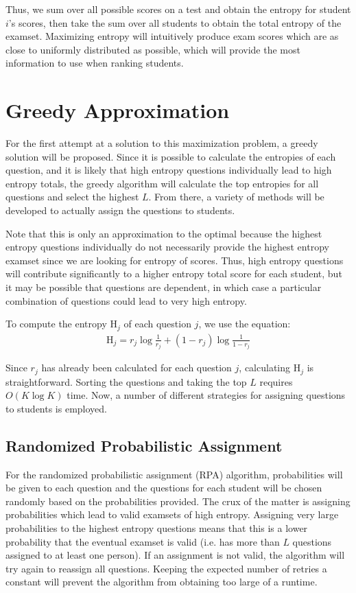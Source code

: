 \documentclass[psamsfonts]{amsart}
\begin{document}
Thus, we sum over all possible scores on a test and obtain the entropy for student $i$'s scores, then take the sum over all students to obtain the total entropy of the examset. Maximizing entropy will intuitively produce exam scores which are as close to uniformly distributed as possible, which will provide the most information to use when ranking students.

\section{Greedy Approximation}

For the first attempt at a solution to this maximization problem, a greedy solution will be proposed. Since it is possible to calculate the entropies of each question, and it is likely that high entropy questions individually lead to high entropy totals, the greedy algorithm will calculate the top entropies for all questions and select the highest $L$. From there, a variety of methods will be developed to actually assign the questions to students. 

Note that this is only an approximation to the optimal because the highest entropy questions individually do not necessarily provide the highest entropy examset since we are looking for entropy of scores. Thus, high entropy questions will contribute significantly to a higher entropy total score for each student, but it may be possible that questions are dependent, in which case a particular combination of questions could lead to very high entropy. 

To compute the entropy $\mathrm{H}_j$ of each question $j$, we use the equation:
\begin{eqnarray}
\mathrm{H}_j = r_j \log \frac{1}{r_j} + (1 - r_j) \log \frac{1}{1 - r_j}
\end{eqnarray}

Since $r_j$ has already been calculated for each question $j$, calculating $\mathrm{H}_j$ is straightforward. Sorting the questions and taking the top $L$ requires $O(K \log K)$ time. Now, a number of different strategies for assigning questions to students is employed.

\subsection{Randomized Probabilistic Assignment}

For the randomized probabilistic assignment (RPA) algorithm, probabilities will be given to each question and the questions for each student will be chosen randomly based on the probabilities provided. The crux of the matter is assigning probabilities which lead to valid examsets of high entropy. Assigning very large probabilities to the highest entropy questions means that this is a lower probability that the eventual examset is valid (i.e. has more than $L$ questions assigned to at least one person). If an assignment is not valid, the algorithm will try again to reassign all questions. Keeping the expected number of retries a constant will prevent the algorithm from obtaining too large of a runtime.
\end{document}
